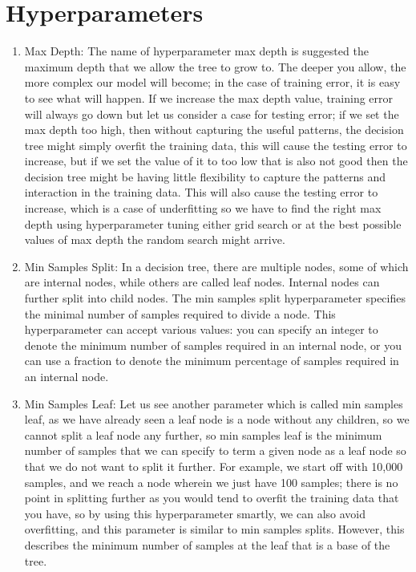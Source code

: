 \section{Hyperparameters}
    \begin{enumerate}
        \item Max Depth: The name of hyperparameter max depth is suggested the maximum depth that we allow the tree to grow to. The deeper you allow, the more complex our model will become; in the case of training error, it is easy to see what will happen. If we increase the max depth value, training error will always go down but let us consider a case for testing error; if we set the max depth too high, then without capturing the useful patterns, the decision tree might simply overfit the training data, this will cause the testing error to increase, but if we set the value of it to too low that is also not good then the decision tree might be having little flexibility to capture the patterns and interaction in the training data. This will also cause the testing error to increase, which is a case of underfitting so we have to find the right max depth using hyperparameter tuning either grid search or at the best possible values of max depth the random search might arrive.
        \item Min Samples Split: In a decision tree, there are multiple nodes, some of which are internal nodes, while others are called leaf nodes. Internal nodes can further split into child nodes. The min samples split hyperparameter specifies the minimal number of samples required to divide a node. This hyperparameter can accept various values: you can specify an integer to denote the minimum number of samples required in an internal node, or you can use a fraction to denote the minimum percentage of samples required in an internal node.        
        \item Min Samples Leaf: Let us see another parameter which is called min samples leaf, as we have already seen a leaf node is a node without any children, so we cannot split a leaf node any further, so min samples leaf is the minimum number of samples that we can specify to term a given node as a leaf node so that we do not want to split it further. For example, we start off with 10,000 samples, and we reach a node wherein we just have 100 samples; there is no point in splitting further as you would tend to overfit the training data that you have, so by using this hyperparameter smartly, we can also avoid overfitting, and this parameter is similar to min samples splits. However, this describes the minimum number of samples at the leaf that is a base of the tree.

\end{enumerate}
